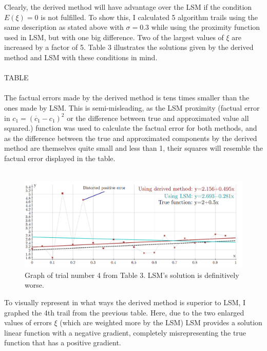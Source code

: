 \documentclass[11pt,a4paper]{article}
\numberwithin{equation}{subsection}
\begin{document}
Clearly, the derived method will have advantage over the LSM if the condition $E(\xi)=0$ is not fulfilled. To show this, I calculated 5 algorithm trails using the same description as stated above with $\sigma=0.3$ while using the proximity function used in LSM, but with one big difference. Two of the largest values of $\xi$ are increased by a factor of 5. Table 3 illustrates the solutions given by the derived method and LSM with these conditions in mind.\\
\\
TABLE\\
\\
The factual errors made by the derived method is tens times smaller than the ones made by LSM. This is semi-misleading, as the LSM proximity (factual error in $c_1=(\dot{c_1}-c_1)^2$ or the difference between true and approximated value all squared.) function was used to calculate the factual error for both methods, and as the difference between the true and approximated components by the derived method are themselves quite small and less than 1, their squares will resemble the factual error displayed in the table.\\
\\
\begin{figure}[h!]
\caption{Graph of trial number 4 from Table 3. LSM's solution is definitively worse.}
\includegraphics[scale=0.35]{updated/table-2}
\centering
\end{figure}
To visually represent in what ways the derived method is superior to LSM, I graphed the 4th trail from the previous table. Here, due to the two enlarged values of errors $\xi$ (which are weighted more by the LSM) LSM provides a solution linear function with a negative gradient, completely misrepresenting the true function that has a positive gradient. 
\end{document}
